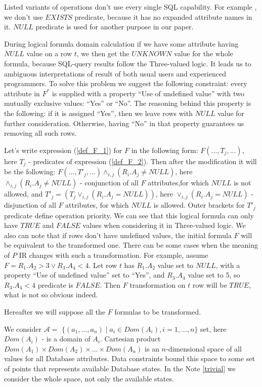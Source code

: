 \documentclass[10pt,journal,cspaper,compsoc]{IEEEtran}
\def \n #1{\mathit{#1}}
\begin{document}
Listed variants of operations don't use every single SQL capability. For example
, we don't use $\n{EXISTS}$ predicate, because it has no expanded attribute
names in it. $\n{NULL}$ predicate is used for another purpose in our paper.

During logical formula domain calculation if we have some attribute having
$NULL$ value on a row $t$, we then get the $\n{UNKNOWN}$ value for the whole
formula, because SQL-query results follow the Three-valued logic. It leads us to
ambiguous interpretations of result of both usual users and experienced
programmers. To solve this problem we suggest the following constraint: every
attribute in $F^{\ast}$ is supplied with a property ``Use of undefined value''
with two mutually exclusive values: ``Yes'' or ``No''. The reasoning behind
this property is the following: if it is assigned ``Yes'', then we leave rows
with $\n{NULL}$ value for further consideration. Otherwise, having ``No'' in
that property guarantees us removing all such rows.

Let's write expression (\ref{def_F_1}) for $F$ in the following form: $ F (\dots
, T_j , \dots )$, here $T_j$ - predicates of expression (\ref{def_F_2}).
Then after the modification it will be the following: 
$F( \dots, T'_j , \dots )\wedge_{i,j}(R_i .A_j \neq  \n{NULL})$, here
$\wedge_{i,j}(R_i .A_j \neq  \n{NULL})$ - conjunction of all $F$ attributes,for
which $\n{NULL}$ is not allowed, and $T'_j = (T_j \vee_{i,j}(R_i .A_j =
\n{NULL}))$, here  $\vee_{i,j}(R_i .A_j = \n{NULL})$ - disjunction of all $F$
attributes, for which $\n{NULL}$ is allowed. Outer brackets for $T'_j$ predicate
define operation priority. We can see that this logical formula can only have
$\n{TRUE}$ and $\n{FALSE}$ values when considering it in Three-valued logic. We
also can note that if rows don't have undefined values, the initial formula $F$
will be equivalent to the transformed one. There can be some cases when the
meaning of $P$ IR changes with such a transformation. For example, assume $F =
R_1 .A_2 > 3 \vee R_3 .A_4 < 4$. Let row $t$ has $R_1 .A_2$ value set to
$\n{NULL}$, with a property ``Use of undefined value'' set to ``Yes'', and $R_3
.A_4$ value set to 5, so $R_3 .A_4 < 4$ predicate is $\n{FALSE}$. Then $F$
transformation on $t$ row will be $\n{TRUE}$, what is not so obvious indeed.

Hereafter we will suppose all the $F$ formulas to be transformed.

We consider $\mathcal{A} =$ $\{(a_1, \dots, a_n)
\mid a_i \in Dom(A_i), i=1,\dots,n\}$ set, here $Dom(A_i)$ - is a domain of
$A_i$. Cartesian product $Dom(A_1)\times Dom(A_2)\times \dots \times Dom(A_n)$
is an $n$-dimensional space of all values for all Database attributes. Data
constraints bound this space to some set of points that represents available
Database states. In the Note \ref{trivial} we consider the whole space, not only
the available states.
\end{document}
